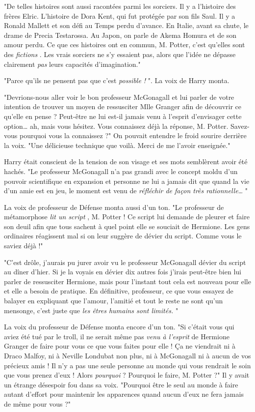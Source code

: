 "De telles histoires sont aussi racontées parmi les sorciers. Il y a l'histoire des frères Elric. L'histoire de Dora Kent, qui fut protégée par son fils Saul. Il y a Ronald Mallett et son défi au Temps perdu d'avance. En Italie, avant sa chute, le drame de Precia Testarossa. Au Japon, on parle de Akema Homura et de son amour perdu. Ce que ces histoires ont en commun, M. Potter, c'est qu'elles sont des \emph{fictions} . Les vrais sorciers ne s'y essaient pas, alors que l'idée ne dépasse clairement \emph{pas}  leurs capacités d'imagination."

"Parce qu'ils ne pensent pas que c'est \emph{possible !} ". La voix de Harry monta.

"Devrions-nous aller voir le bon professeur McGonagall et lui parler de votre intention de trouver un moyen de ressusciter Mlle Granger afin de découvrir ce qu'elle en pense ? Peut-être ne lui est-il jamais venu à l'esprit d'envisager cette option… ah, mais vous hésitez. Vous connaissez déjà la réponse, M. Potter. Savez-vous pourquoi vous la connaissez ?" On pouvait entendre le froid sourire derrière la voix. "Une délicieuse technique que voilà. Merci de me l'avoir enseignée."

Harry était conscient de la tension de son visage et ses mots semblèrent avoir été hachés. "Le professeur McGonagall n'a pas grandi avec le concept moldu d'un pouvoir scientifique en expansion et personne ne lui a jamais dit que quand la vie d'un amie est en jeu, le moment est venu de \emph{réfléchir de façon très rationnelle…} "

La voix de professeur de Défense monta aussi d'un ton. "Le professeur de métamorphose \emph{lit un script} , M. Potter ! Ce script lui demande de pleurer et faire son deuil afin que tous sachent à quel point elle se souciait de Hermione. Les gens ordinaires réagissent mal si on leur suggère de dévier du script. Comme vous le saviez déjà !"

"C'est drôle, j'aurais pu jurer avoir vu le professeur McGonagall dévier du script au dîner d'hier. Si je la voyais en dévier dix autres fois j'irais peut-être bien lui parler de ressusciter Hermione, mais pour l'instant tout cela est nouveau pour elle et elle a besoin de pratique. En définitive, professeur, ce que vous essayez de balayer en expliquant que l'amour, l'amitié et tout le reste ne sont qu'un mensonge, c'est juste que \emph{les êtres humains sont limités.} "

La voix du professeur de Défense monta encore d'un ton. "Si c'était vous qui aviez été tué par le troll, il ne serait même pas \emph{venu à l'esprit}  de Hermione Granger de faire pour vous ce que vous faites pour elle ! Ça ne viendrait ni à Draco Malfoy, ni à Neville Londubat non plus, ni à McGonagall ni à aucun de vos précieux amis ! Il n'y a pas une seule personne au monde qui vous rendrait le soin que vous prenez d'eux ! Alors \emph{pourquoi}  ? Pourquoi le faire, M. Potter ?" Il y avait un étrange désespoir fou dans sa voix. "Pourquoi être le seul au monde à faire autant d'effort pour maintenir les apparences quand aucun d'eux ne fera jamais de même pour vous ?"

